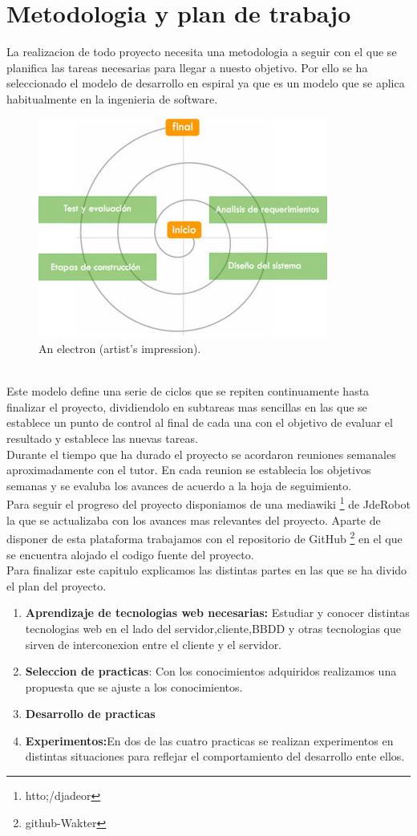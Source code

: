 \section{Metodologia y plan de trabajo}
La realizacion de todo proyecto necesita una metodologia a seguir con el que se planifica las tareas necesarias para llegar a nuesto objetivo. Por ello se ha seleccionado el modelo de desarrollo en espiral ya que es un modelo que se aplica habitualmente en la ingenieria de software.
\begin{figure}[!h]
\begin{center}
  \includegraphics[width=0.6\linewidth]{Figures/modelo}
	\decoRule
	\caption[An Electron]{An electron (artist's impression).}
\label{fig:canvas}
\end{center}
\end{figure}
\\Este modelo define una serie de ciclos que se repiten continuamente hasta finalizar el proyecto, dividiendolo en subtareas mas sencillas en las que se establece un punto de control al final de cada una con el objetivo de evaluar el resultado y establece las nuevas tareas.
\\Durante  el tiempo que ha durado el proyecto se acordaron reuniones semanales aproximadamente con el tutor. En cada reunion se establecia los objetivos semanas y se evaluba los avances de acuerdo a la hoja de seguimiento. 
\\Para seguir el progreso del proyecto  disponiamos de una mediawiki \footnote{htto;/djadeor} de JdeRobot la que se actualizaba con los avances mas relevantes del proyecto. Aparte de disponer de esta plataforma trabajamos con el repositorio de GitHub \footnote{github-Wakter}  en el que se encuentra alojado el codigo fuente del proyecto.
\\Para finalizar este capitulo explicamos las distintas partes en las que se ha divido  el plan del proyecto.
\begin{enumerate}
\item \textbf{Aprendizaje de tecnologias web necesarias:} Estudiar y conocer distintas tecnologias  web en el  lado del servidor,cliente,BBDD y otras tecnologias que sirven de interconexion entre el cliente y el servidor.
\item \textbf{Seleccion de practicas}: Con los conocimientos adquiridos realizamos una propuesta que se ajuste a los conocimientos.
\item \textbf{Desarrollo de practicas}
\item \textbf{Experimentos:}En dos de las cuatro practicas se realizan experimentos en distintas situaciones para reflejar el comportamiento del desarrollo ente ellos.
\end{enumerate}
